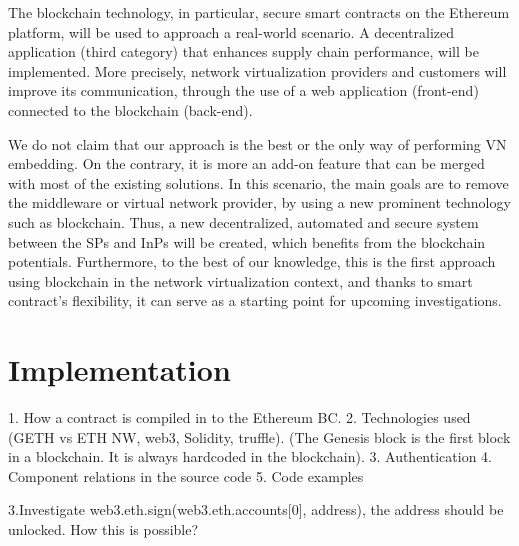 The blockchain technology, in particular, secure smart contracts on the Ethereum platform, will be used to approach a real-world scenario. A decentralized application (third category) that enhances supply chain performance, will be implemented. More precisely, network virtualization providers and customers will improve its communication, through the use of a web application (front-end) connected to the blockchain (back-end).

We do not claim that our approach is the best or the only way
of performing VN embedding. On the contrary, it is more an add-on feature that can be merged with most of the existing solutions. In this scenario, the main goals are to remove the middleware or virtual network provider, by using a new prominent technology such as blockchain. Thus, a new decentralized, automated and secure system between the SPs and InPs will be created, which benefits from the blockchain potentials. Furthermore, to the best of our knowledge, this is the first approach using blockchain in the network virtualization context, and thanks to smart contract's flexibility, it can serve as a starting point for upcoming investigations.


\chapter{Implementation}

1. How a contract is compiled in to the Ethereum BC.
2. Technologies used (GETH vs ETH NW, web3, Solidity, truffle).
(The Genesis block is the first block in a blockchain. It is always hardcoded in the blockchain).
3. Authentication 
4. Component relations in the source code
5. Code examples

3.Investigate web3.eth.sign(web3.eth.accounts[0], address), the address should be unlocked. How this is possible?

\label{ch:implementation}



